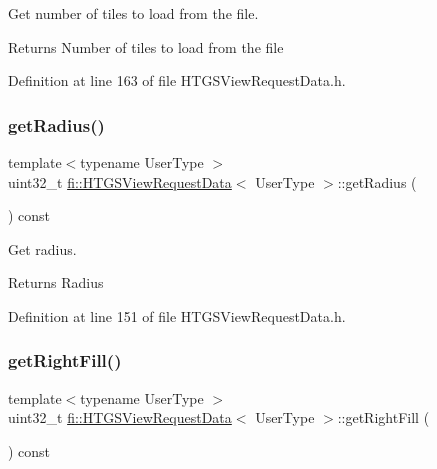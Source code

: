 Get number of tiles to load from the file. 

\begin{DoxyReturn}{Returns}
Number of tiles to load from the file 
\end{DoxyReturn}


Definition at line 163 of file H\+T\+G\+S\+View\+Request\+Data.\+h.

\mbox{\label{classfi_1_1HTGSViewRequestData_aa94dde78818cb7bbccfbc280e09ff95f}} 
\subsubsection{\texorpdfstring{get\+Radius()}{getRadius()}}
{\footnotesize\ttfamily template$<$typename User\+Type $>$ \\
uint32\+\_\+t \hyperlink{classfi_1_1HTGSViewRequestData}{fi\+::\+H\+T\+G\+S\+View\+Request\+Data}$<$ User\+Type $>$\+::get\+Radius (\begin{DoxyParamCaption}{ }\end{DoxyParamCaption}) const\hspace{0.3cm}{\ttfamily [inline]}}



Get radius. 

\begin{DoxyReturn}{Returns}
Radius 
\end{DoxyReturn}


Definition at line 151 of file H\+T\+G\+S\+View\+Request\+Data.\+h.

\mbox{\label{classfi_1_1HTGSViewRequestData_a6561f54627c62eae81106ec6f1ae18a1}} 
\subsubsection{\texorpdfstring{get\+Right\+Fill()}{getRightFill()}}
{\footnotesize\ttfamily template$<$typename User\+Type $>$ \\
uint32\+\_\+t \hyperlink{classfi_1_1HTGSViewRequestData}{fi\+::\+H\+T\+G\+S\+View\+Request\+Data}$<$ User\+Type $>$\+::get\+Right\+Fill (\begin{DoxyParamCaption}{ }\end{DoxyParamCaption}) const\hspace{0.3cm}{\ttfamily [inline]}}



